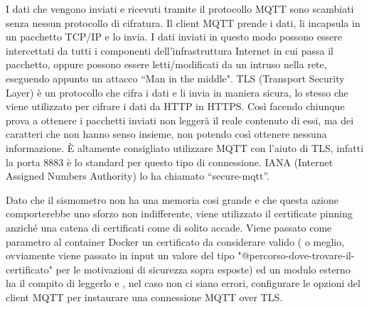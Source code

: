 \documentclass[a4paper,10pt]{memoir}
\begin{document}
I dati che vengono inviati e ricevuti tramite il protocollo MQTT sono scambiati senza nessun protocollo di cifratura. Il client MQTT prende i dati, li incapsula in un pacchetto TCP/IP e lo invia.
I dati inviati in questo modo possono essere intercettati da tutti i componenti dell'infrastruttura Internet in cui passa il pacchetto, oppure possono essere letti/modificati da un intruso nella rete, eseguendo appunto un attacco ``Man in the middle".
TLS (Transport Security Layer) è un protocollo che cifra i dati e li invia in maniera sicura, lo stesso che viene utilizzato per cifrare i dati da HTTP in HTTPS.
Così facendo chiunque prova a ottenere i pacchetti inviati non leggerà il reale contenuto di essi, ma dei caratteri che non hanno senso insieme, non potendo così ottenere nessuna informazione.
È altamente consigliato utilizzare MQTT con l'aiuto di TLS, infatti la porta 8883 è lo standard per questo tipo di connessione. IANA (Internet Assigned Numbers Authority) lo ha chiamato  “secure-mqtt”.

Dato che il sismometro non ha una memoria cosi grande e che questa azione comporterebbe uno sforzo non indifferente, viene utilizzato il certificate pinning anziché una catena di certificati come di solito accade.
Viene passato come parametro al container Docker un certificato da considerare valido ( o meglio, ovviamente viene passato in input un valore del tipo "@percorso-dove-trovare-il-certificato" per le motivazioni di sicurezza sopra esposte) ed un modulo esterno ha il compito di leggerlo e , nel caso non ci siano errori, configurare le opzioni del client MQTT per instaurare una connessione MQTT over TLS.
\end{document}

